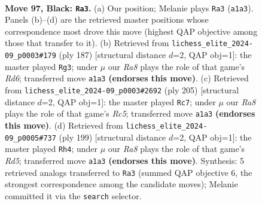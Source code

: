 \documentclass[11pt]{article}
\begin{document}
\clearpage

\begin{figure}[p]\centering
\begin{subfigure}{0.46\textwidth}\centering
\resizebox{\linewidth}{!}{%
\newchessgame
\chessboard[
  setfen={6R1/8/1k6/8/7r/8/5K2/r7 b - - 5 97},
  showmover=false,
  pgfstyle=straightmove, color=movearrow, markmove={a1-a3}
]}
\caption{}
\end{subfigure}\hfill
\begin{subfigure}{0.46\textwidth}\centering
\resizebox{\linewidth}{!}{%
\newchessgame
\chessboard[
  setfen={8/7k/2K5/8/8/3r4/8/R7 b - - 9 94},
  showmover=false,
  pgfstyle=straightmove, color=movearrow, markmove={d3-g3}
]}
\caption{}
\end{subfigure}
\\[4pt]
\begin{subfigure}{0.46\textwidth}\centering
\resizebox{\linewidth}{!}{%
\newchessgame
\chessboard[
  setfen={6k1/8/8/6K1/2r5/1R6/8/8 b - - 2 103},
  showmover=false,
  pgfstyle=straightmove, color=movearrow, markmove={c4-c7}
]}
\caption{}
\end{subfigure}\hfill
\begin{subfigure}{0.46\textwidth}\centering
\resizebox{\linewidth}{!}{%
\newchessgame
\chessboard[
  setfen={7k/8/4K3/8/3r4/8/8/R7 b - - 29 100},
  showmover=false,
  pgfstyle=straightmove, color=movearrow, markmove={d4-h4}
]}
\caption{}
\end{subfigure}
\caption{\textbf{Move 97, Black: \texttt{Ra3}.} (a) Our position; Melanie plays \texttt{Ra3} (\texttt{a1a3}). Panels (b)--(d) are the retrieved master positions whose correspondence most drove this move (highest QAP objective among those that transfer to it). (b) Retrieved from \texttt{lichess\_elite\_2024-09\_p0003\#179} (ply 187) [structural distance $d$=2, QAP obj=1]: the master played \texttt{Rg3}; under $\mu$ our \emph{Ra8} plays the role of that game's \emph{Rd6}; transferred move \texttt{a1a3} \textbf{(endorses this move)}. (c) Retrieved from \texttt{lichess\_elite\_2024-09\_p0003\#2692} (ply 205) [structural distance $d$=2, QAP obj=1]: the master played \texttt{Rc7}; under $\mu$ our \emph{Ra8} plays the role of that game's \emph{Rc5}; transferred move \texttt{a1a3} \textbf{(endorses this move)}. (d) Retrieved from \texttt{lichess\_elite\_2024-09\_p0005\#737} (ply 199) [structural distance $d$=2, QAP obj=1]: the master played \texttt{Rh4}; under $\mu$ our \emph{Ra8} plays the role of that game's \emph{Rd5}; transferred move \texttt{a1a3} \textbf{(endorses this move)}. Synthesis: 5 retrieved analogs transferred to \texttt{Ra3} (summed QAP objective 6, the strongest correspondence among the candidate moves); Melanie committed it via the \texttt{search} selector.}
\label{fig:thought-m193}
\end{figure}
\end{document}

